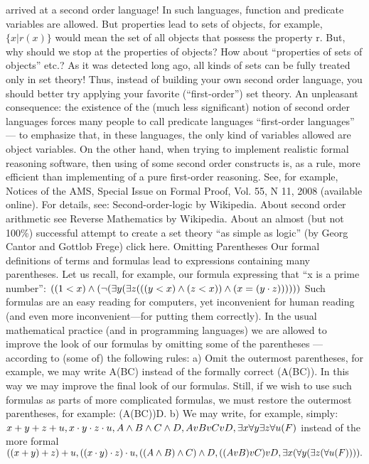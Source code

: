 arrived at a second order language! In such languages, function and predicate variables are allowed. But properties lead to
sets of objects, for example, \(\{x | r(x)\}\) would mean the set of all objects that possess the property r. But, why should we stop at
the properties of objects? How about ``properties of sets of objects'' etc.? As it was detected long ago, all kinds of sets can be
fully treated only in set theory! Thus, instead of building your own second order language, you should better try applying your
favorite (``first-order'') set theory. An unpleasant consequence: the existence of the (much less significant) notion of second
order languages forces many people to call predicate languages ``first-order languages'' --- to emphasize that, in these
languages, the only kind of variables allowed are object variables.
On the other hand, when trying to implement realistic formal reasoning software, then using of some second order constructs
is, as a rule, more efficient than implementing of a pure first-order reasoning. See, for example, Notices of the AMS, Special
Issue on Formal Proof, Vol. 55, N 11, 2008 (available online).
For details, see: Second-order-logic by Wikipedia. About second order arithmetic see Reverse Mathematics by Wikipedia.
About an almost (but not 100\%) successful attempt to create a set theory ``as simple as logic'' (by Georg Cantor and Gottlob
Frege) click here.
Omitting Parentheses
Our formal definitions of terms and formulas lead to expressions containing many parentheses. Let us
recall, for example, our formula expressing that ``x is a prime number'':
\(((1<x)\wedge (\neg (\exists y(\exists z(((y<x)\wedge (z<x))\wedge (x=(y\cdot z))))))\)
Such formulas are an easy reading for computers, yet inconvenient for human reading (and even more
inconvenient---for putting them correctly). In the usual mathematical practice (and in programming
languages) we are allowed to improve the look of our formulas by omitting some of the parentheses ---
according to (some of) the following rules:
a) Omit the outermost parentheses, for example, we may write A\IMPLIES (B\IMPLIES C) instead of the formally correct
(A\IMPLIES (B\IMPLIES C)). In this way we may improve the final look of our formulas. Still, if we wish to use such
formulas as parts of more complicated formulas, we must restore the outermost parentheses, for example:
(A\IMPLIES (B\IMPLIES C))\IMPLIES D.
b) We may write, for example, simply:
\(x+y+z+u, x\cdot y\cdot z\cdot u, A\wedge B\wedge C\wedge D, AvBvCvD, \exists x\forall y\exists z\forall u(F)\)
instead of the more formal
\(((x+y)+z)+u, ((x\cdot y)\cdot z)\cdot u, ((A\wedge B)\wedge C)\wedge D, ((AvB)vC)vD, \exists x(\forall y(\exists z(\forall u(F)))).\)

